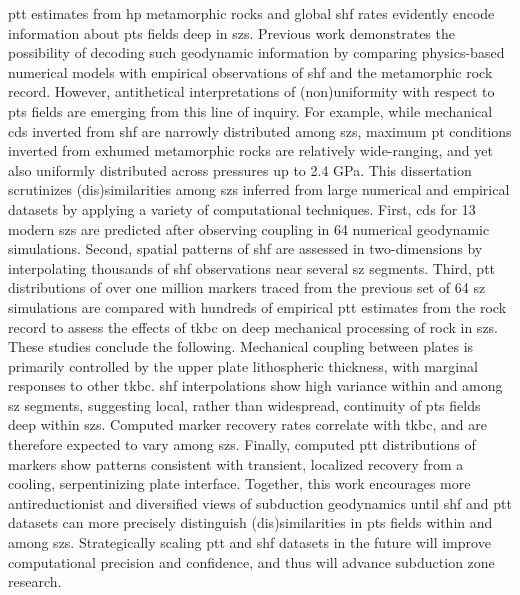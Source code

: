 \Gls{ptt} estimates from \gls{hp} metamorphic rocks and global \gls{shf} rates evidently encode information about \gls{pts} fields deep in \glspl{sz}. Previous work demonstrates the possibility of decoding such geodynamic information by comparing physics-based numerical models with empirical observations of \gls{shf} and the metamorphic rock record. However, antithetical interpretations of (non)uniformity with respect to \gls{pts} fields are emerging from this line of inquiry. For example, while
mechanical \glspl{cd} inverted from \gls{shf} are narrowly distributed among \glspl{sz}, maximum \gls{pt} conditions inverted from exhumed metamorphic rocks are relatively wide-ranging, and yet also uniformly distributed across pressures up to 2.4 GPa. This dissertation scrutinizes (dis)similarities among \glspl{sz} inferred from large numerical and empirical datasets by applying a variety of computational techniques. First, \glspl{cd} for 13 modern \glspl{sz} are predicted after observing coupling in 64 numerical
geodynamic simulations. Second, spatial patterns of \gls{shf} are assessed in two-dimensions by interpolating thousands of \gls{shf} observations near several \gls{sz} segments. Third, \gls{ptt} distributions of over one million markers traced from the previous set of 64 \gls{sz} simulations are compared with hundreds of empirical \gls{ptt} estimates from the rock record to assess the effects of \gls{tkbc} on deep mechanical processing of rock in \glspl{sz}. These studies conclude the following. Mechanical
coupling between plates is primarily controlled by the upper plate lithospheric thickness, with marginal responses to other \gls{tkbc}. \Gls{shf} interpolations show high variance within and among \gls{sz} segments, suggesting local, rather than widespread, continuity of \gls{pts} fields deep within \glspl{sz}. Computed marker recovery rates correlate with \gls{tkbc}, and are therefore expected to vary among \glspl{sz}. Finally, computed \gls{ptt} distributions
of markers show patterns consistent with transient, localized recovery from a cooling, serpentinizing plate interface. Together, this work encourages more antireductionist and diversified views of subduction geodynamics until \gls{shf} and \gls{ptt} datasets can more precisely distinguish (dis)similarities in \gls{pts} fields within and among \glspl{sz}. Strategically scaling \gls{ptt} and \gls{shf} datasets in the future will improve computational precision and confidence, and thus will advance subduction zone research.